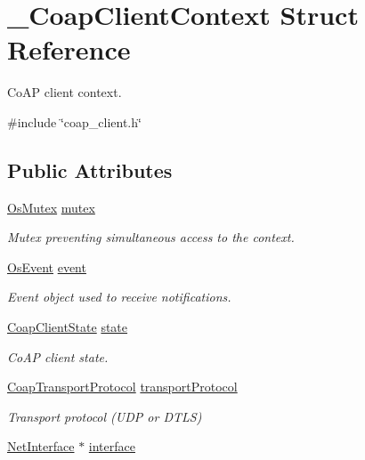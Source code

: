\hypertarget{struct__CoapClientContext}{}\section{\+\_\+\+Coap\+Client\+Context Struct Reference}
\label{struct__CoapClientContext}


Co\+AP client context.  




{\ttfamily \#include \char`\"{}coap\+\_\+client.\+h\char`\"{}}

\subsection*{Public Attributes}
\begin{DoxyCompactItemize}
\item 
\hyperlink{structOsMutex}{Os\+Mutex} \hyperlink{struct__CoapClientContext_aca958f920545fb498a5d1c6c61746372}{mutex}
\begin{DoxyCompactList}\small\item\em Mutex preventing simultaneous access to the context. \end{DoxyCompactList}\item 
\hyperlink{structOsEvent}{Os\+Event} \hyperlink{struct__CoapClientContext_a3210ea687fa301c529cdab6875b1eeec}{event}
\begin{DoxyCompactList}\small\item\em Event object used to receive notifications. \end{DoxyCompactList}\item 
\hyperlink{coap__client_8h_a0449d3c44dfab2ba1d564f8d7d50bf7d}{Coap\+Client\+State} \hyperlink{struct__CoapClientContext_a18f8dc14411d087894b08291c864c1c5}{state}
\begin{DoxyCompactList}\small\item\em Co\+AP client state. \end{DoxyCompactList}\item 
\hyperlink{coap__common_8h_acfca0beb05471516d1793f8ae992c53a}{Coap\+Transport\+Protocol} \hyperlink{struct__CoapClientContext_ae67a6b2bd38744f8f6f1828867efbab1}{transport\+Protocol}
\begin{DoxyCompactList}\small\item\em Transport protocol (U\+DP or D\+T\+LS) \end{DoxyCompactList}\item 
\hyperlink{net_8h_a2234db8911a1148c9159979d8f5e0d6b}{Net\+Interface} $\ast$ \hyperlink{struct__CoapClientContext_af8ce2c2d8b0d9dca4b6cca02393e3984}{interface}

\end{DoxyCompactItemize}
